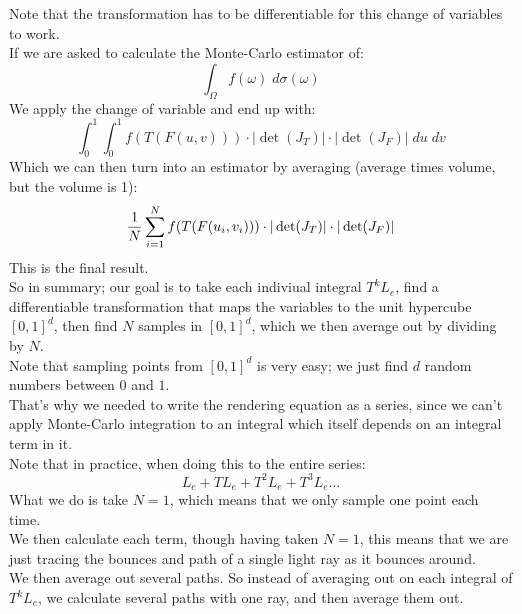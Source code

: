 \documentclass[12pt]{article}
\begin{document}
Note that the transformation has to be 
differentiable for this change of variables
to work. \\

If we are asked to calculate the
Monte-Carlo estimator of:
\[ \int_\Omega f(\omega) \; d\sigma(\omega) \]
We apply the change of variable
and end up with:
\[ \int_0^{1} \int_0^{1} 
f(T(F(u, v))) \cdot
|\det(J_T)| \cdot
|\det(J_F)| \; du \; dv \]
Which we can then turn into an estimator
by averaging (average times volume,
but the volume is 1):
\[ \dfrac{1}{N} \sum_{i = 1}^{N}
f(T(F(u_i, v_i))) \cdot
|\det(J_T)| \cdot |\det(J_F)| \]
This is the final result. \\

So in summary;
our goal is to take each indiviual integral
$T^kL_e$,
find a differentiable transformation
that maps the variables to the unit hypercube
$[0, 1]^d$,
then find $N$ samples in $[0, 1]^d$,
which we then average out by dividing by $N$. \\

Note that sampling points from $[0, 1]^d$
is very easy; we just find $d$ random numbers
between $0$ and $1$. \\

That's why we needed to write the rendering
equation as a series, since we can't apply
Monte-Carlo integration to an integral
which itself depends on an integral term in it. \\

Note that in practice,
when doing this to the entire series:
\[ L_e + TL_e + T^2L_e + T^3L_e \dots \]
What we do is take $N = 1$,
which means that we only sample one point
each time. \\
We then calculate each term,
though having taken $N = 1$,
this means that we are just
tracing the bounces and path of a single
light ray as it bounces around. \\
We then average out several paths. 
So instead of averaging out
on each integral of $T^kL_e$,
we calculate several paths with one ray,
and then average them out. \\

\newpage
\end{document}
